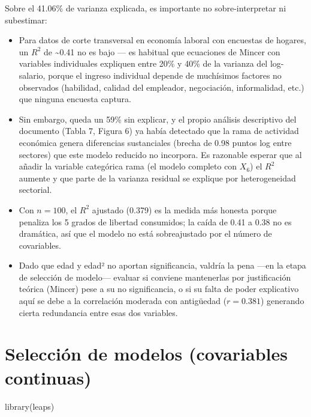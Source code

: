 \documentclass[
  spanish,
  letterpaper,
  DIV=11,
  numbers=noendperiod]{scrartcl}
\newenvironment{Shaded}{\begin{snugshade}}{\end{snugshade}}
\newcommand{\FunctionTok}[1]{\textcolor[rgb]{0.28,0.35,0.67}{#1}}
\newcommand{\NormalTok}[1]{\textcolor[rgb]{0.00,0.23,0.31}{#1}}
\providecommand{\tightlist}{%
  \setlength{\itemsep}{0pt}\setlength{\parskip}{0pt}}
\begin{document}
Sobre el 41.06\% de varianza explicada, es importante no
sobre-interpretar ni subestimar:

\begin{itemize}
\tightlist
\item
  Para datos de corte transversal en economía laboral con encuestas de
  hogares, un \(R^2\) de \textasciitilde0.41 no es bajo --- es habitual
  que ecuaciones de Mincer con variables individuales expliquen entre
  20\% y 40\% de la varianza del log-salario, porque el ingreso
  individual depende de muchísimos factores no observados (habilidad,
  calidad del empleador, negociación, informalidad, etc.) que ninguna
  encuesta captura.
\item
  Sin embargo, queda un 59\% sin explicar, y el propio análisis
  descriptivo del documento (Tabla 7, Figura 6) ya había detectado que
  la rama de actividad económica genera diferencias sustanciales (brecha
  de 0.98 puntos log entre sectores) que este modelo reducido no
  incorpora. Es razonable esperar que al añadir la variable categórica
  rama (el modelo completo con \(X_6\)) el \(R^2\) aumente y que parte
  de la varianza residual se explique por heterogeneidad sectorial.
\item
  Con \(n=100\), el \(R^2\) ajustado (0.379) es la medida más honesta
  porque penaliza los 5 grados de libertad consumidos; la caída de 0.41
  a 0.38 no es dramática, así que el modelo no está sobreajustado por el
  número de covariables.
\item
  Dado que edad y edad² no aportan significancia, valdría la pena ---en
  la etapa de selección de modelo--- evaluar si conviene mantenerlas por
  justificación teórica (Mincer) pese a su no significancia, o si su
  falta de poder explicativo aquí se debe a la correlación moderada con
  antigüedad (\(r=0.381\)) generando cierta redundancia entre esas dos
  variables.
\end{itemize}

\section{Selección de modelos (covariables
continuas)}\label{selecciuxf3n-de-modelos-covariables-continuas}

\begin{Shaded}
\begin{Highlighting}[]
\FunctionTok{library}\NormalTok{(leaps)}
\end{Highlighting}
\end{Shaded}
\end{document}
